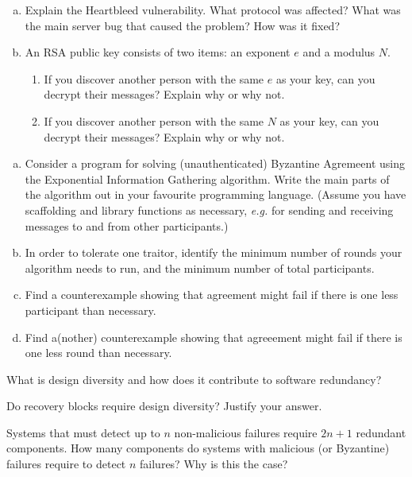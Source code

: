 
\begin{enumerate}[(a)]
\item Explain the Heartbleed vulnerability.  What protocol was affected? What was the main server bug that caused the problem?  How was it fixed?
		\item An RSA public key consists of two items: an exponent $e$ and a modulus $N$. 
				\begin{enumerate}
						\item  If you discover another person with the same $e$ as your key, can you decrypt their messages?  Explain why or why not.
						\item  If you discover another person with the same $N$ as your key, can you decrypt their messages?  Explain why or why not.
				\end{enumerate}
		\end{enumerate}


\begin{enumerate}[(a)]
			\item  Consider a program for solving (unauthenticated) Byzantine Agremeent using the Exponential Information Gathering algorithm.  Write the main parts of the algorithm out in your favourite programming language.  (Assume you have scaffolding and library functions as necessary, {\it e.g.} for sending and receiving messages to and from other participants.)
			\item In order to tolerate one traitor, identify the minimum number of rounds your algorithm needs to run, and the minimum number of total participants.  
			\item Find a counterexample showing that agreement might fail if there is one less participant than necessary.
			\item Find a(nother) counterexample showing that agreeement might fail if there is one less round than necessary.
		\end{enumerate}
	


What is design diversity and how does it contribute to software redundancy?


Do recovery blocks require design diversity? Justify your answer.


Systems that must detect up to $n$ non-malicious failures require  $2n + 1$ redundant components. How many components do systems with malicious (or Byzantine) failures require to detect $n$ failures? Why is this the case?


